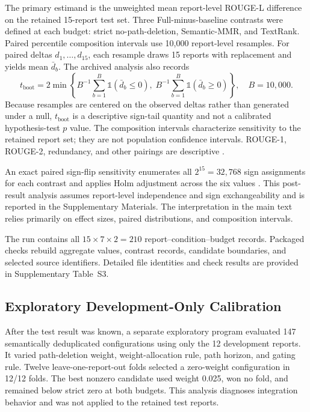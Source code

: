 \documentclass[applsci,article,submit,moreauthors]{Definitions/mdpi}
\begin{document}
The primary estimand is the unweighted mean report-level ROUGE-L difference on the retained 15-report test set. Three Full-minus-baseline contrasts were defined at each budget: strict no-path-deletion, Semantic-MMR, and TextRank. Paired percentile composition intervals use 10,000 report-level resamples. For paired deltas $d_1,\ldots,d_{15}$, each resample draws 15 reports with replacement and yields mean $\bar d_b$. The archived analysis also records
\begin{equation}
t_{\mathrm{boot}}=2\min\left\{B^{-1}\sum_{b=1}^{B}\mathbb{1}(\bar d_b\leq0),\;B^{-1}\sum_{b=1}^{B}\mathbb{1}(\bar d_b\geq0)\right\},\quad B=10{,}000.
\end{equation}
Because resamples are centered on the observed deltas rather than generated under a null, $t_{\mathrm{boot}}$ is a descriptive sign-tail quantity and not a calibrated hypothesis-test $p$ value. The composition intervals characterize sensitivity to the retained report set; they are not population confidence intervals. ROUGE-1, ROUGE-2, redundancy, and other pairings are descriptive \cite{cameron2008bootstrap}.

An exact paired sign-flip sensitivity enumerates all $2^{15}=32{,}768$ sign assignments for each contrast and applies Holm adjustment across the six values \cite{holm1979simple}. This post-result analysis assumes report-level independence and sign exchangeability and is reported in the Supplementary Materials. The interpretation in the main text relies primarily on effect sizes, paired distributions, and composition intervals.

The run contains all $15\times7\times2=210$ report--condition--budget records. Packaged checks rebuild aggregate values, contrast records, candidate boundaries, and selected source identifiers. Detailed file identities and check results are provided in Supplementary Table~S3.

\subsection{Exploratory Development-Only Calibration}

After the test result was known, a separate exploratory program evaluated 147 semantically deduplicated configurations using only the 12 development reports. It varied path-deletion weight, weight-allocation rule, path horizon, and gating rule. Twelve leave-one-report-out folds selected a zero-weight configuration in 12/12 folds. The best nonzero candidate used weight 0.025, won no fold, and remained below strict zero at both budgets. This analysis diagnoses integration behavior and was not applied to the retained test reports.
\end{document}
